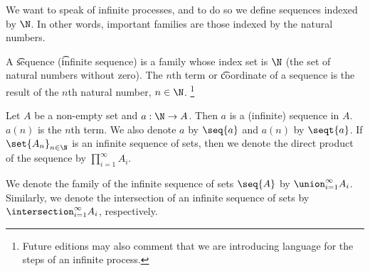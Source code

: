 
We want to speak of infinite processes, and to do so we define sequences indexed by $\N$.
In other words, important families are those indexed by the natural numbers.


A \t{sequence} (\t{infinite sequence}) is a family whose index set is $\N $ (the set of natural numbers without zero).
The \t{$n$th term} or \t{coordinate} of a sequence is the result of the $n$th natural number, $n \in \N $.
  \ifhmode\unskip\fi\footnote{
Future editions may also comment that we are introducing language for the steps of an infinite process.
  }


Let $A$ be a non-empty set and $a: \N  \to A$.
Then $a$ is a (infinite) sequence in $A$.
$a(n)$ is the $n$th term.
We also denote $a$ by $\seq{a}$ and $a(n)$ by $\seqt{a}$.
If $\set{A_n}_{n \in \N }$ is an infinite sequence of sets, then we denote the direct product of the sequence by $\prod_{i = 1}^{\infty} A_i$.


We denote the family of the infinite sequence of sets $\seq{A}$ by $\union_{i = 1}^{\infty} A_i$.
Similarly, we denote the intersection of an infinite sequence of sets by $\intersection_{i = 1}^{\infty} A_i$, respectively.

\blankpage
